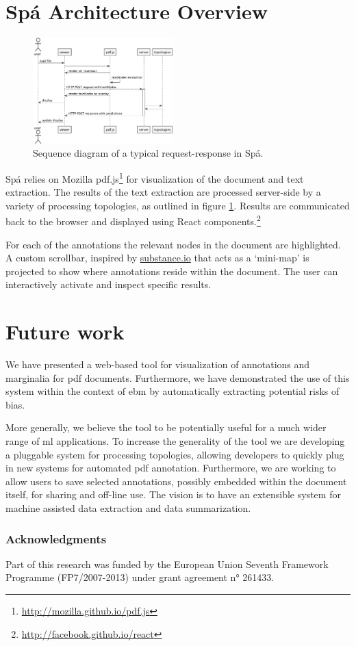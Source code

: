 \documentclass[runningheads,a4paper]{llncs}
\begin{document}
\section{Spá Architecture Overview}

\label{section:architecture}
\begin{figure}
  \vspace{-2em}
  \includegraphics[width=0.48\textwidth]{./diagrams/sequence.pdf}
  \vspace{-1em}
  \caption{\label{fig:sequence}Sequence diagram of a typical request-response in Spá.}
  \vspace{-1.5em}
\end{figure}

Spá relies on Mozilla pdf.js\footnote{\url{http://mozilla.github.io/pdf.js}} for visualization of the document and text extraction.
The results of the text extraction are processed server-side by a variety of processing topologies, as outlined in figure \ref{fig:sequence}.
Results are communicated back to the browser and displayed using React components.\footnote{\url{http://facebook.github.io/react}}

For each of the annotations the relevant nodes in the document are highlighted.
A custom scrollbar, inspired by \href{http://substance.io/}{substance.io} that acts as a `mini-map' is projected to show where annotations reside within the document.
The user can interactively activate and inspect specific results.

\section{Future work}
We have presented a web-based tool for visualization of annotations and marginalia for \ac{pdf} documents.
Furthermore, we have demonstrated the use of this system within the context of \acl{ebm} by automatically extracting potential risks of bias.

More generally, we believe the tool to be potentially useful for a much wider range of \acl{ml} applications.
To increase the generality of the tool we are developing a pluggable system for processing topologies, allowing developers to quickly plug in new systems for automated \ac{pdf} annotation.
Furthermore, we are working to allow users to save selected annotations, possibly embedded within the document itself, for sharing and off-line use.
The vision is to have an extensible system for machine assisted data extraction and data summarization.

\subsubsection{Acknowledgments}
Part of this research was funded by the European Union Seventh Framework Programme (FP7/2007-2013) under grant agreement n° 261433. %




\end{document}
